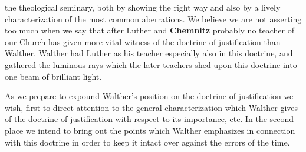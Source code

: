 the theological seminary, both by showing the right way and also by a lively characterization of the most common aberrations.  We believe we are not asserting too much when we say that after Luther and \textbf{Chemnitz} probably no teacher of our Church has given more vital witness of the doctrine of justification than Walther.  Walther had Luther as his teacher especially also in this doctrine, and gathered the luminous rays which the later teachers shed upon this doctrine into one beam of brilliant light.

                As we prepare to expound Walther’s position on the doctrine of justification we wish, first to direct attention to the general characterization which Walther gives of the doctrine of justification with respect to its importance, etc.  In the second place we intend to bring out the points which Walther emphasizes in connection with this doctrine in order to keep it intact over against the errors of the time.
\divider
